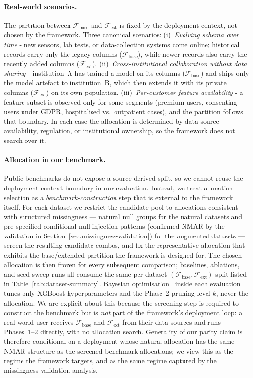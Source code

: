 \documentclass[sigconf]{acmart}
\begin{document}
\begin{itemize}
\paragraph{Real-world scenarios.} The partition between $\mathcal{F}_{\text{base}}$ and $\mathcal{F}_{\text{ext}}$ is fixed by the deployment context, not chosen by the framework. Three canonical scenarios:
(i)~\emph{Evolving schema over time} - new sensors, lab tests, or data-collection systems come online; historical records carry only the legacy columns ($\mathcal{F}_{\text{base}}$), while newer records also carry the recently added columns ($\mathcal{F}_{\text{ext}}$).
(ii)~\emph{Cross-institutional collaboration without data sharing} - institution~A has trained a model on its columns ($\mathcal{F}_{\text{base}}$) and ships only the model artefact to institution~B, which then extends it with its private columns ($\mathcal{F}_{\text{ext}}$) on its own population.
(iii)~\emph{Per-customer feature availability} - a feature subset is observed only for some segments (premium users, consenting users under GDPR, hospitalised vs.\ outpatient cases), and the partition follows that boundary.
In each case the allocation is determined by data-source availability, regulation, or institutional ownership, so the framework does not search over it.

\paragraph{Allocation in our benchmark.} Public benchmarks do not expose a source-derived split, so we cannot reuse the deployment-context boundary in our evaluation. Instead, we treat allocation selection as a \emph{benchmark-construction} step that is external to the framework itself. For each dataset we restrict the candidate pool to allocations consistent with structured missingness --- natural null groups for the natural datasets and pre-specified conditional null-injection patterns (confirmed NMAR by the validation in Section~\ref{sec:missingness-validation}) for the augmented datasets --- screen the resulting candidate combos, and fix the representative allocation that exhibits the base/extended partition the framework is designed for. The chosen allocation is then frozen for every subsequent comparison; baselines, ablations, and seed-sweep runs all consume the same per-dataset $(\mathcal{F}_{\text{base}}, \mathcal{F}_{\text{ext}})$ split listed in Table~\ref{tab:dataset-summary}. Bayesian optimisation~\cite{optuna} inside each evaluation tunes only XGBoost hyperparameters and the Phase~2 pruning level $k$, never the allocation. We are explicit about this because the screening step is required to construct the benchmark but is \emph{not} part of the framework's deployment loop: a real-world user receives $\mathcal{F}_{\text{base}}$ and $\mathcal{F}_{\text{ext}}$ from their data sources and runs Phases~1--2 directly, with no allocation search. Generality of our parity claim is therefore conditional on a deployment whose natural allocation has the same NMAR structure as the screened benchmark allocations; we view this as the regime the framework targets, and as the same regime captured by the missingness-validation analysis.


\end{itemize}
\end{document}
